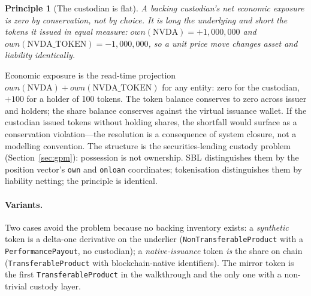 \documentclass[11pt,a4paper]{article}
\newtheorem{principle}[definition]{Principle}
\begin{document}
\begin{principle}[The custodian is flat]
A backing custodian's net economic exposure is zero by conservation, not by choice. It is long the underlying and short the tokens it issued in equal measure: $own(\text{NVDA})=+1{,}000{,}000$ and $own(\text{NVDA\_TOKEN})=-1{,}000{,}000$, so a unit price move changes asset and liability identically.
\end{principle}

Economic exposure is the read-time projection $own(\text{NVDA})+own(\text{NVDA\_TOKEN})$ for any entity: zero for the custodian, $+100$ for a holder of 100 tokens. The token balance conserves to zero across issuer and holders; the share balance conserves against the virtual issuance wallet. If the custodian issued tokens without holding shares, the shortfall would surface as a conservation violation---the resolution is a consequence of system closure, not a modelling convention. The structure is the securities-lending custody problem (Section~\ref{sec:gpm}): possession is not ownership. SBL distinguishes them by the position vector's \texttt{own} and \texttt{onloan} coordinates; tokenisation distinguishes them by liability netting; the principle is identical.

\paragraph{Variants.} Two cases avoid the problem because no backing inventory exists: a \emph{synthetic} token is a delta-one derivative on the underlier (\texttt{Non\allowbreak Transferable\allowbreak Product} with a \texttt{PerformancePayout}, no custodian); a \emph{native-issuance} token \emph{is} the share on chain (\texttt{Transferable\allowbreak Product} with blockchain-native identifiers). The mirror token is the first \texttt{Transferable\allowbreak Product} in the walkthrough and the only one with a non-trivial custody layer.
\end{document}
